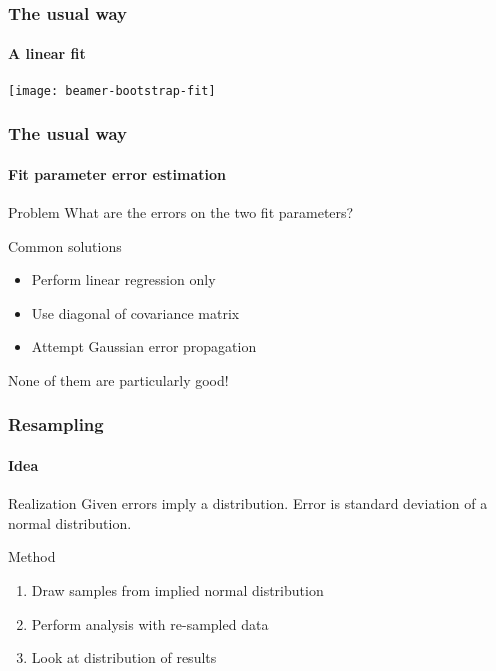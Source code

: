 \documentclass[english, fleqn]{beamer}
\begin{document}
\begin{frame}
    \frametitle{The usual way}
    \framesubtitle{A linear fit}
    \centering
    \texttt{[image: beamer-bootstrap-fit]}
\end{frame}

\begin{frame}
    \frametitle{The usual way}
    \framesubtitle{Fit parameter error estimation}

    \begin{alertblock}{Problem}
        What are the errors on the two fit parameters?
    \end{alertblock}

    \pause

    \begin{block}{Common solutions}
        \begin{itemize}
            \item
                Perform linear regression only
            \item
                Use diagonal of covariance matrix
            \item
                Attempt Gaussian error propagation
        \end{itemize}
    \end{block}

    \pause

    None of them are particularly good!
\end{frame}


\begin{frame}
    \frametitle{Resampling}
    \framesubtitle{Idea}

    \begin{block}{Realization}
            Given errors imply a distribution. Error is standard deviation of a
            normal distribution.
    \end{block}

    \pause

    \begin{block}{Method}
        \begin{enumerate}
            \item Draw samples from implied normal distribution
            \item Perform analysis with re-sampled data
            \item Look at distribution of results
        \end{enumerate}
    \end{block}
\end{frame}
\end{document}
